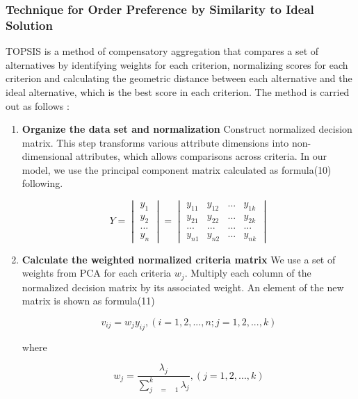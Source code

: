 \documentclass{mcmthesis}
\begin{document}
        \subsubsection{Technique for Order Preference by Similarity to Ideal Solution}
          TOPSIS is a method of compensatory aggregation that compares a set of alternatives by identifying weights for each criterion, normalizing scores for each criterion and calculating the geometric distance between each alternative and the ideal alternative, which is the best score in each criterion.
          The method is carried out as follows :
        \begin{enumerate}
          \item \textbf{Organize the data set and normalization}
          Construct normalized decision matrix. This step transforms various attribute dimensions into non-dimensional attributes, which allows comparisons across criteria.
          In our model, we use the principal component matrix calculated as formula(10) following.
            \begin{table}[!hbpt]
               \centering
               $$ { Y }=\begin{vmatrix} { y }_{ 1 } \\ { y }_{ 2 } \\ ... \\ { y }_{ n } \end{vmatrix}=\begin{vmatrix} { { y }_{ 11 } } & { y }_{ 12 } & ... & { y }_{ 1k } \\ { y }_{ 21 } & { y }_{ 22 } & ... & { y }_{ 2k } \\ ... & ... & ... & ... \\ { y }_{ n1 } & { y }_{ n2 } & ... & { y }_{ nk } \end{vmatrix} $$
             \end{table}
          \item \textbf{Calculate the weighted normalized criteria matrix}
          We  use a set of weights from PCA for each criteria $w_{j}$. Multiply each column of the normalized decision matrix by its associated weight. An element of the new matrix is shown as formula(11)
            \begin{table}[!hbpt]
               \centering
               $$ v_{ij} = w_j y_{ij}, (i = 1,2,...,n; j=1,2,...,k) $$
             \end{table}
        where
            \begin{table}[!hbpt]
               \centering
               $$ { w  }_{ j }=\frac { { { \lambda  }_{ j } }  }{ \sum _{ j\quad =\quad 1 }^{ k }{ { \lambda  }_{ j } }  } ,(j =1,2,...,k) $$
             \end{table}


\end{enumerate}
\end{document}
